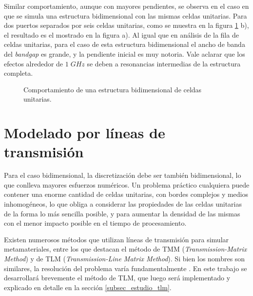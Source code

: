 Similar comportamiento, aunque con mayores pendientes, se observa en el caso en que se simula una estructura bidimensional con las mismas celdas unitarias. Para dos puertos separados por seis celdas unitarias, como se muestra en la figura \ref{fig:s12-estructura2d-super} b), el resultado es el mostrado en la figura a). Al igual que en análisis de la fila de celdas unitarias, para el caso de esta estructura bidimensional el ancho de banda del \textit{bandgap} es grande, y la pendiente inicial es muy notoria. Vale aclarar que los efectos alrededor de $1\; GHz$ se deben a resonancias intermedias de la estructura completa.


\begin{figure}[h]
	\centering 
	\hspace{0pt}
	\caption{Comportamiento de una estructura bidimensional de celdas unitarias.}
	\label{fig:s12-estructura2d-super}	
\end{figure}  



\section{Modelado por líneas de transmisión}

Para el caso bidimensional, la discretización debe ser también bidimensional, lo que conlleva mayores esfuerzos numéricos. Un problema práctico cualquiera puede contener una enorme cantidad de celdas unitarias, con bordes complejos y medios inhomogéneos, lo que obliga a considerar las propiedades de las celdas unitarias de la forma lo más sencilla posible, y para aumentar la densidad de las mismas con el menor impacto posible en el tiempo de procesamiento.

Existen numerosos métodos que utilizan líneas de transmisión para simular metamateriales, entre los que destacan el método de TMM (\textit{Transmission-Matrix Method}) y de TLM (\textit{Transmission-Line Matrix Method}). Si bien los nombres son similares, la resolución del problema varía fundamentalmente \cite{Caloz:ElectromagneticMetamaterials}. En este trabajo se desarrollará brevemente el método de TLM, que luego será implementado y explicado en detalle en la sección \ref{subsec_estudio_tlm}.

